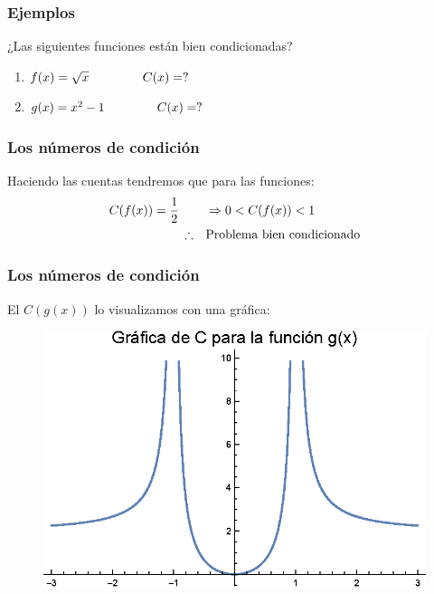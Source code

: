 \documentclass[12pt]{beamer}
\begin{document}
\begin{frame}
\frametitle{Ejemplos}
¿Las siguientes funciones están bien condicionadas?
\pause
{}
\begin{enumerate}[<+->]
\item $f (x) = \sqrt{x} \hspace{1.5cm} C (x) = ?$
\item $g (x) = x^{2} - 1 \hspace{1.5cm} C (x) = ?$
\end{enumerate}
\end{frame}
\begin{frame}
\frametitle{Los números de condición}
Haciendo las cuentas tendremos que para las funciones:
\pause
\begin{align*}
C (f (x) ) = \dfrac{1}{2} \hspace{0.75cm} &\Rightarrow 0 < C (f (x) ) < 1 \\
\therefore \quad &\text{Problema bien condicionado}
\end{align*}
\end{frame}
\begin{frame}
\frametitle{Los números de condición}
El $C (g (x) )$ lo visualizamos con una gráfica:
\pause
\begin{figure}
	\centering
	\includegraphics[scale=0.85]{Imagenes/Condicion_02.eps}
\end{figure}
\end{frame}
\end{document}
